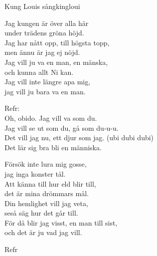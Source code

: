 \begin{song}{Kung Louis sång}{kingloui}
\begin{vers}
Jag kungen är över alla här\\
under trädens gröna höjd.\\
Jag har nått opp, till högsta topp,\\
men ännu är jag ej nöjd.\\
Jag vill ju va en man, en mänska, \\
och kunna allt Ni kan.\\
Jag vill inte längre apa mig, \\
jag vill ju bara va en man.\\
\end{vers}
\begin{vers}
Refr:\\
Oh, obido. Jag vill va som du.\\
Jag vill se ut som du, gå som du-u-u.\\
Det vill jag nu, ett djur som jag. (ubi dubi dubi)\\
Det lär sig bra bli en människa.\\
\end{vers}
\begin{vers}
Försök inte lura mig gosse, \\
jag inga konster tål.\\
Att känna till hur eld blir till, \\
det är mina drömmars mål.\\
Din hemlighet vill jag veta, \\
seså säg hur det går till.\\
För då blir jag visst, en man till sist, \\
och det är ju vad jag vill.\\
\end{vers}
\begin{vers}
Refr\\
\end{vers}
\end{song}

